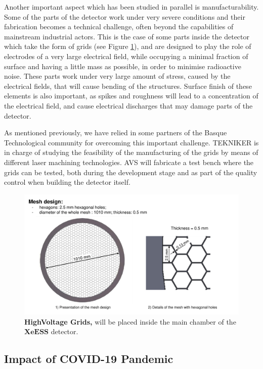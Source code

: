 \documentclass[12pt,a4paper,article]{report} %
\begin{document}
Another important aspect which has been studied in parallel is manufacturability. Some of the parts of the detector work under very severe conditions and their fabrication becomes a technical challenge, often beyond the capabilities of mainstream industrial actors. This is the case of some parts inside the detector which take the form of grids (see Figure \ref{grids}), and are designed to play the role of electrodes of a very large electrical field, while occupying a minimal fraction of surface and having a little mass as possible, in order to minimise radioactive noise. These parts work under very large amount of stress, caused by the electrical fields, that will cause bending of the structures. Surface finish of these elements is also important, as spikes and roughness will lead to a concentration of the electrical field, and cause electrical discharges that may damage parts of the detector. 

As mentioned previously, we have relied in some partners of the Basque Technological community for overcoming this important challenge. TEKNIKER is in charge of studying the feasibility of the manufacturing of the grids by means of different laser machining technologies. AVS will fabricate a test bench where the grids can be tested, both during the development stage and as part of the quality control when building the detector itself. 

\begin{figure}[ht]
\begin{center}
\includegraphics[width=14cm]{Grids}
\caption{\textbf{HighVoltage Grids,} will be placed inside the main chamber of the $\mathbf{XeESS}$ detector.}
\label{grids}
\end{center}
\end{figure}

\subsection*{Impact of COVID-19 Pandemic}
\end{document}
